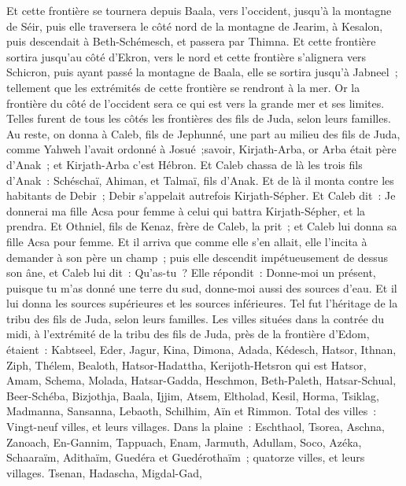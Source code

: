 \begin{multicols}{2}
Et cette frontière se tournera depuis Baala, vers l'occident, jusqu'à la montagne de Séir, puis elle traversera le côté nord de la montagne de Jearim, à Kesalon, puis descendait à Beth-Schémesch, et passera par Thimna.
Et cette frontière sortira jusqu'au côté d'Ekron, vers le nord et cette frontière s'alignera vers Schicron, puis ayant passé la montagne de Baala, elle se sortira jusqu'à Jabneel~; tellement que les extrémités de cette frontière se rendront à la mer. 
Or la frontière du côté de l'occident sera ce qui est vers la grande mer et ses limites. Telles furent de tous les côtés les frontières des fils de Juda, selon leurs familles.
Au reste, on donna à Caleb, fils de Jephunné, une part au milieu des fils de Juda, comme Yahweh l'avait ordonné à Josué~;savoir, Kirjath-Arba, or Arba était père d'Anak~; et Kirjath-Arba c'est Hébron.
Et Caleb chassa de là les trois fils d'Anak~: Schéschaï, Ahiman, et Talmaï, fils d'Anak.
Et de là il monta contre les habitants de Debir~; Debir s'appelait autrefois Kirjath-Sépher.
Et Caleb dit~: Je donnerai ma fille Acsa pour femme à celui qui battra Kirjath-Sépher, et la prendra.
Et Othniel, fils de Kenaz, frère de Caleb, la prit~; et Caleb lui donna sa fille Acsa pour femme.
Et il arriva que comme elle s'en allait, elle l'incita à demander à son père un champ~; puis elle descendit impétueusement de dessus son âne, et Caleb lui dit~: Qu'as-tu~? 
Elle répondit~: Donne-moi un présent, puisque tu m'as donné une terre du sud, donne-moi aussi des sources d'eau. Et il lui donna les sources supérieures et les sources inférieures.
Tel fut l'héritage de la tribu des fils de Juda, selon leurs familles.
Les villes situées dans la contrée du midi, à l'extrémité de la tribu des fils de Juda, près de la frontière d'Edom, étaient~: Kabtseel, Eder, Jagur,
Kina, Dimona, Adada,
Kédesch, Hatsor, Ithnan,
Ziph, Thélem, Bealoth,
Hatsor-Hadattha, Kerijoth-Hetsron qui est Hatsor,
Amam, Schema, Molada,
Hatsar-Gadda, Heschmon, Beth-Paleth,
Hatsar-Schual, Beer-Schéba, Bizjothja,
Baala, Ijjim, Atsem,
Eltholad, Kesil, Horma,
Tsiklag, Madmanna, Sansanna,
Lebaoth, Schilhim, Aïn et Rimmon. Total des villes~: Vingt-neuf villes, et leurs villages.
Dans la plaine~: Eschthaol, Tsorea, Aschna,
Zanoach, En-Gannim, Tappuach, Enam,
Jarmuth, Adullam, Soco, Azéka,
Schaaraïm, Adithaïm, Guedéra et Guedérothaïm~; quatorze villes, et leurs villages.
Tsenan, Hadascha, Migdal-Gad,

\end{multicols}
